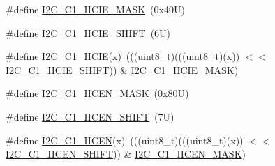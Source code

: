 \begin{DoxyCompactItemize}
\item 
\#define \mbox{\hyperlink{group___i2_c___register___masks_gada20a7267cfb048f5f30adacf115a9c6}{I2\+C\+\_\+\+C1\+\_\+\+I\+I\+C\+I\+E\+\_\+\+M\+A\+SK}}~(0x40\+U)
\item 
\#define \mbox{\hyperlink{group___i2_c___register___masks_gaeddb698e3eec8ce064fa68ebbfd06e09}{I2\+C\+\_\+\+C1\+\_\+\+I\+I\+C\+I\+E\+\_\+\+S\+H\+I\+FT}}~(6\+U)
\item 
\#define \mbox{\hyperlink{group___i2_c___register___masks_ga6dbf8bbd7e2cbe7c2db10407d1195bcc}{I2\+C\+\_\+\+C1\+\_\+\+I\+I\+C\+IE}}(x)~(((uint8\+\_\+t)(((uint8\+\_\+t)(x)) $<$$<$ \mbox{\hyperlink{group___i2_c___register___masks_gaeddb698e3eec8ce064fa68ebbfd06e09}{I2\+C\+\_\+\+C1\+\_\+\+I\+I\+C\+I\+E\+\_\+\+S\+H\+I\+FT}})) \& \mbox{\hyperlink{group___i2_c___register___masks_gada20a7267cfb048f5f30adacf115a9c6}{I2\+C\+\_\+\+C1\+\_\+\+I\+I\+C\+I\+E\+\_\+\+M\+A\+SK}})
\item 
\#define \mbox{\hyperlink{group___i2_c___register___masks_ga93aaf10d7a7527ef23e270b7a2dd335d}{I2\+C\+\_\+\+C1\+\_\+\+I\+I\+C\+E\+N\+\_\+\+M\+A\+SK}}~(0x80\+U)
\item 
\#define \mbox{\hyperlink{group___i2_c___register___masks_ga963bec89f31364bb2dfe369173d8d412}{I2\+C\+\_\+\+C1\+\_\+\+I\+I\+C\+E\+N\+\_\+\+S\+H\+I\+FT}}~(7\+U)
\item 
\#define \mbox{\hyperlink{group___i2_c___register___masks_ga7ea496e9a5688b0501f72e3163624e63}{I2\+C\+\_\+\+C1\+\_\+\+I\+I\+C\+EN}}(x)~(((uint8\+\_\+t)(((uint8\+\_\+t)(x)) $<$$<$ \mbox{\hyperlink{group___i2_c___register___masks_ga963bec89f31364bb2dfe369173d8d412}{I2\+C\+\_\+\+C1\+\_\+\+I\+I\+C\+E\+N\+\_\+\+S\+H\+I\+FT}})) \& \mbox{\hyperlink{group___i2_c___register___masks_ga93aaf10d7a7527ef23e270b7a2dd335d}{I2\+C\+\_\+\+C1\+\_\+\+I\+I\+C\+E\+N\+\_\+\+M\+A\+SK}})
\end{DoxyCompactItemize}

